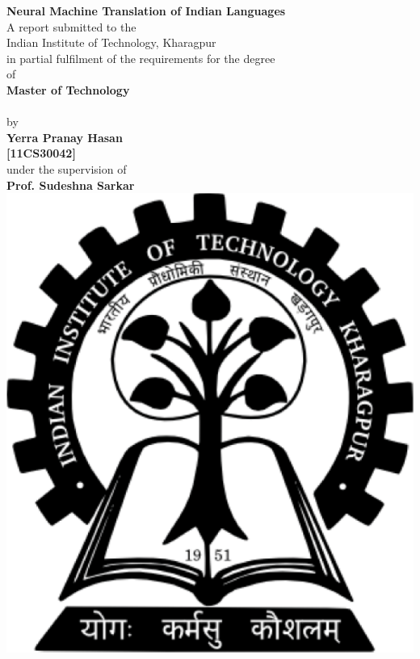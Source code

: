 \documentclass[12pt]{report}
\begin{document}








\thispagestyle{empty}
\begin{center}

\textbf{\LARGE Neural Machine Translation of Indian Languages}\\[2em]

A report submitted to the\\[-0.5em]
Indian Institute of Technology, Kharagpur\\[-0.5em]
in partial fulfilment of the requirements for the degree\\[0.6em]
of\\[0.6em]

\textbf{\large Master of Technology}\\[-0.5em]
\textbf{}\\[0.5em]

by\\[0.3em]
\textbf{\large Yerra Pranay Hasan}\\[-0.3em]
\textbf{\large [11CS30042]}\\[1em]

under the supervision of\\[0em]
\textbf{\large Prof. Sudeshna Sarkar}\\[2em]

\vspace{2em}
\includegraphics[scale=0.3]{kgp-logo.pdf}
\vspace{2em}


\end{center}
\end{document}
